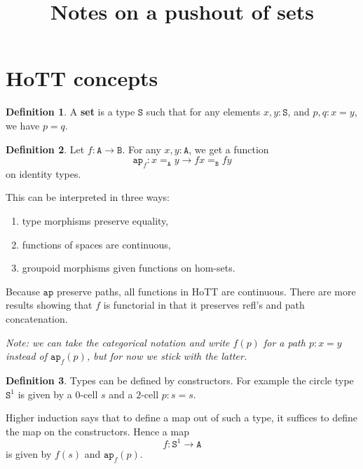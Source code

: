 \documentclass[12pt]{amsart}
\newcommand{\from}{\colon}
\newcommand{\tin}{\colon}
\newcommand{\type}[1]{\mathtt{#1}}
\theoremstyle{remark}
\theoremstyle{definition}
\newtheorem{defn}{Definition}
\begin{document}
\title{Notes on a pushout of sets}
\maketitle

\section{HoTT concepts}

\begin{defn} %
	\label{def:set}
	A \textbf{set} is a type $ \type{S} $ such that
	for any elements $ x,y \tin \type{S} $,
	and $ p,q \tin x = y $, we have $ p = q $.
\end{defn}

\begin{defn} %
	\label{def:ap}
	Let $ f \from \type{ A } \to \type{B} $.
	For any $ x,y \tin \type{ A } $, we get a function 
	\[
	\type{ap}_f \from 
	x =_\type{A} y \to fx =_\type{B} fy
	\]
	on identity types.  
	
	This can be interpreted in three ways:
	\begin{enumerate}
		\item type morphisms preserve equality,
		\item functions of spaces are continuous,
		\item groupoid morphisms given functions
		on hom-sets.
	\end{enumerate}
	Because $ \type{ ap } $ preserve paths, 
	all functions in HoTT are continuous.
	There are more results showing that
	$ f $ is functorial in that it preserves
	refl's and path concatenation.
	
	\emph{Note: we can take the categorical
		notation and write $ f ( p ) $ for a path
		$ p \tin x = y $ instead of 
		$ \type{ ap }_f ( p ) $, 
		but for now we stick with the latter.}
\end{defn}

\begin{defn} %
	Types can be defined by constructors.
	For example the circle type $ \type{S}^1 $
	is given by a $ 0 $-cell $s$ and 
	a $ 2 $-cell $ p \tin s = s $.
	
	Higher induction says that to define
	a map out of such a type, it suffices
	to define the map on the constructors.
	Hence a map 
	\[
		f \from \type{ S }^1 \to \type{ A }
	\] 
	is given by $ f ( s ) $ and 
	$\type{ ap }_f ( p )$.
\end{defn}
\end{document}
